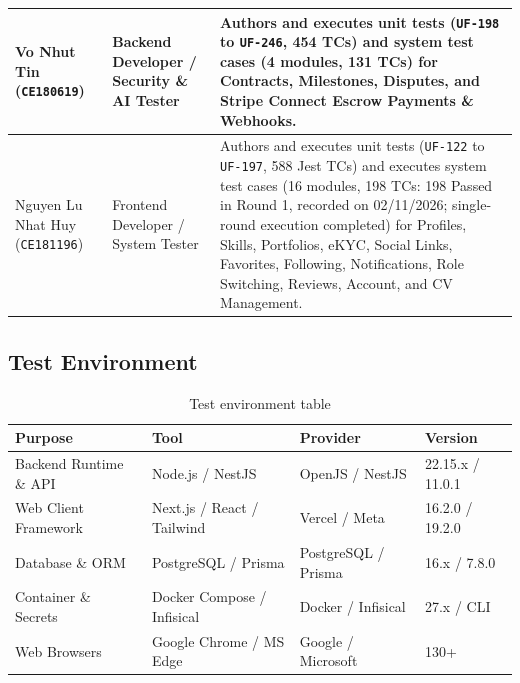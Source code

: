 \documentclass[12pt,a4paper]{article}
\newcommand{\hd}[1]{\textbf{#1}}
\begin{document}
\begin{table}[H]
\begin{tabularx}{\textwidth}{|L{4.5cm}|L{2.9cm}|Y|}
Vo Nhut Tin \newline (\texttt{CE180619})  & Backend Developer / \newline Security \& AI Tester & Authors and executes unit tests (\texttt{UF-198} to \texttt{UF-246}, 454 TCs) and system test cases (4 modules, 131 TCs) for Contracts, Milestones, Disputes, and Stripe Connect Escrow Payments \& Webhooks. \\ \hline
Nguyen Lu Nhat Huy \newline (\texttt{CE181196})  & Frontend Developer / \newline System Tester & Authors and executes unit tests (\texttt{UF-122} to \texttt{UF-197}, 588 Jest TCs) and executes system test cases (16 modules, 198 TCs: 198 Passed in Round 1, recorded on 02/11/2026; single-round execution completed) for Profiles, Skills, Portfolios, eKYC, Social Links, Favorites, Following, Notifications, Role Switching, Reviews, Account, and CV Management. \\ \hline
\end{tabularx}
\endgroup
\end{table}

\subsection{Test Environment}

\begin{table}[H]
\caption{Test environment table}
\begin{tabularx}{\textwidth}{|L{3.7cm}|Y|L{3.2cm}|L{2.7cm}|}
\hline
{}\hd{Purpose} & \hd{Tool} & \hd{Provider} & \hd{Version} \\ \hline
Backend Runtime \& API & Node.js / NestJS & OpenJS / NestJS & 22.15.x / 11.0.1 \\ \hline
Web Client Framework & Next.js / React / Tailwind & Vercel / Meta & 16.2.0 / 19.2.0 \\ \hline
Database \& ORM & PostgreSQL / Prisma & PostgreSQL / Prisma & 16.x / 7.8.0 \\ \hline
Container \& Secrets & Docker Compose / Infisical & Docker / Infisical & 27.x / CLI \\ \hline
Web Browsers & Google Chrome / MS Edge & Google / Microsoft & 130+ \\ \hline
\end{tabularx}
\end{table}
\end{document}

